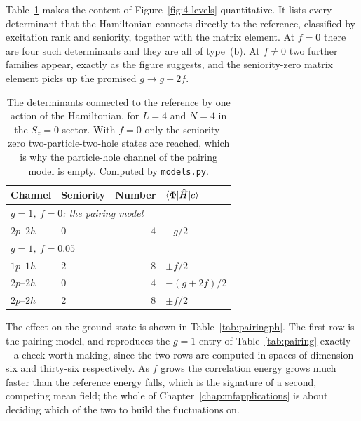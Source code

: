 Table~\ref{tab:pairingphcoupling} makes the content of
Figure~\ref{fig:4-levels} quantitative.  It lists every determinant that the
Hamiltonian connects directly to the reference, classified by excitation rank
and seniority, together with the matrix element.  At $f=0$ there are four such
determinants and they are all of type~(b).  At $f\ne0$ two further families
appear, exactly as the figure suggests, and the seniority-zero matrix element
picks up the promised $g\to g+2f$.

\begin{table}[h]
\centering
\renewcommand{\arraystretch}{1.25}
\setlength{\tabcolsep}{10pt}
\begin{tabular}{llrl}
\toprule
\textbf{Channel} & \textbf{Seniority} & \textbf{Number} &
$\langle \Phi | \hat{H} | c \rangle$\\
\midrule
\multicolumn{4}{l}{\emph{$g=1$, $f=0$: the pairing model}}\\
$2p$--$2h$ & $0$ & $4$ & $-g/2$\\
\midrule
\multicolumn{4}{l}{\emph{$g=1$, $f=0.05$}}\\
$1p$--$1h$ & $2$ & $8$ & $\pm f/2$\\
$2p$--$2h$ & $0$ & $4$ & $-(g+2f)/2$\\
$2p$--$2h$ & $2$ & $8$ & $\pm f/2$\\
\bottomrule
\end{tabular}
\caption{The determinants connected to the reference by one action of the
Hamiltonian, for $L=4$ and $N=4$ in the $S_z=0$ sector.  With $f=0$ only the
seniority-zero two-particle-two-hole states are reached, which is why the
particle-hole channel of the pairing model is empty.  Computed by
\texttt{models.py}.}
\label{tab:pairingphcoupling}
\end{table}

The effect on the ground state is shown in Table~\ref{tab:pairingph}.  The
first row is the pairing model, and reproduces the $g=1$ entry of
Table~\ref{tab:pairing} exactly -- a check worth making, since the two rows
are computed in spaces of dimension six and thirty-six respectively.  As $f$
grows the correlation energy grows much faster than the reference energy
falls, which is the signature of a second, competing mean field; the whole of
Chapter~\ref{chap:mfapplications} is about deciding which of the two to build
the fluctuations on.

